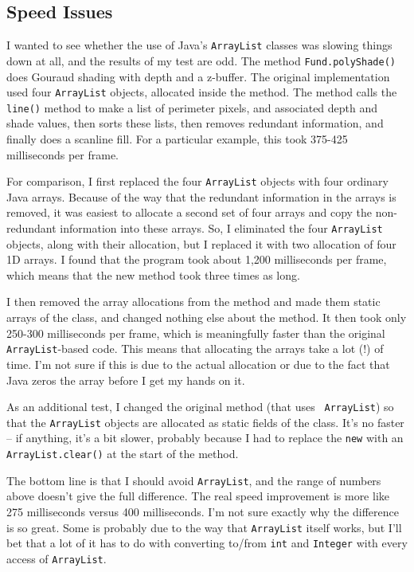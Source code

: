 \documentclass[titlepage,oneside,10pt]{article}
\begin{document}
\subsection{Speed Issues}

I wanted to see whether the use of Java's {\tt ArrayList} classes was
slowing things down at all, and the results of my test are odd. The
method {\tt Fund.polyShade()} does Gouraud shading with depth and a
z-buffer. The original implementation used four {\tt ArrayList}
objects, allocated inside the method. The method calls the {\tt
  line()} method to make a list of perimeter pixels, and associated
depth and shade values, then sorts these lists, then removes redundant
information, and finally does a scanline fill. For a particular
example, this took 375-425 milliseconds per frame. 

For comparison, I first replaced the four {\tt ArrayList} objects with
four ordinary Java arrays. Because of the way that the redundant
information in the arrays is removed, it was easiest to allocate a
second set of four arrays and copy the non-redundant information into
these arrays. So, I eliminated the four {\tt ArrayList} objects, along
with their allocation, but I replaced it with two allocation of four
1D arrays. I found that the program took about 1,200 milliseconds per
frame, which means that the new method took three times as long.

I then removed the array allocations from the method and made them
static arrays of the class, and changed nothing else about the
method. It then took only 250-300 milliseconds per frame, which is
meaningfully faster than the original {\tt ArrayList}-based code. This
means that allocating the arrays take a lot (!) of time. I'm not sure
if this is due to the actual allocation or due to the fact that Java
zeros the array before I get my hands on it.

As an additional test, I changed the original method (that uses {\tt
ArrayList}) so that the {\tt ArrayList} objects are allocated as
static fields of the class. It's no faster -- if anything, it's a bit
slower, probably because I had to replace the {\tt new} with an {\tt
  ArrayList.clear()} at the start of the method. 

The bottom line is that I should avoid {\tt ArrayList}, and the range
of numbers above doesn't give the full difference. The real speed
improvement is more like 275 milliseconds versus 400 milliseconds. I'm
not sure exactly why the difference is so great. Some is probably due
to the way that {\tt ArrayList} itself works, but I'll bet that a lot
of it has to do with converting to/from {\tt int} and {\tt Integer}
with every access of {\tt ArrayList}.
\end{document}
